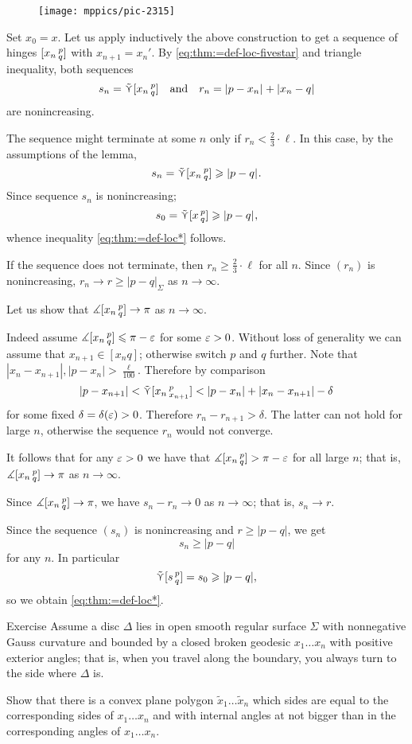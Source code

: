 \begin{figure}[h!]
\centering
\texttt{[image: mppics/pic-2315]}
\end{figure}

Set $x_0=x$.
Let us apply inductively the above construction to get a sequence of hinges  $[x_n\,{}^{p}_{q}]$ with $x_{n+1}=x_n'$.
By \ref{eq:thm:=def-loc-fivestar} and triangle inequality, both sequences
\[s_n=\side \hinge{x_n}pq\quad\text{and}\quad r_n=\dist{p}{x_n}{}+\dist{x_n}{q}{}\]
are nonincreasing.

The sequence might terminate at some $n$ only if $r_n< \tfrac{2}{3}\cdot\ell $.
In this case, by the assumptions of the lemma, 
\[s_n=\side \hinge{x_n}p q\ge\dist{p}{q}{}.\]
Since sequence $s_n$ is nonincreasing;
\[s_0=\side \hinge{x}p q\ge\dist{p}{q}{},\]
whence inequality \ref{eq:thm:=def-loc*} follows.

If the sequence does not terminate, then $r_n\ge\tfrac{2}{3}\cdot\ell$ for all $n$.
Since $(r_n)$ is nonincreasing, $r_n\to r\ge |p-q|_\Sigma$ as $n\to\infty$.

Let us show that $\measuredangle[x_n\,{}^{p}_{q}]\to \pi$ as $n\to\infty$.

Indeed assume $\measuredangle[x_n\,{}^{p}_{q}]\leqslant \pi-\varepsilon$ for some $\varepsilon>0$.
Without loss of generality we can assume that $x_{n+1}\in [x_nq]$;
otherwise switch $p$ and $q$ further.
Note that $|x_n-x_{n+1}|,|p-x_n|>\tfrac\ell{100}$.
Therefore by comparison 
\[|p-x_{n+1}|<\side\hinge{x_n}p{x_{n+1}}<|p-x_n|+|x_n-x_{n+1}|-\delta\]
for some fixed $\delta=\delta(\varepsilon)>0$.
Therefore $r_n-r_{n+1}>\delta$.
The latter can not hold for large $n$, otherwise the sequence $r_n$ would not converge.

It follows that for any $\varepsilon>0$ we have that $\measuredangle[x_n\,{}^{p}_{q}]> \pi-\varepsilon$ for all large $n$;
that is, $\measuredangle[x_n\,{}^{p}_{q}]\to \pi$ as $n\to\infty$.

Since $\measuredangle[x_n\,{}^{p}_{q}]\to \pi$, we have 
$s_n-r_n\to 0$ as $n\to\infty$;
that is, $s_n\to r$.

Since the sequence $(s_n)$ is nonincreasing and $r\ge |p-q|$, we get
\[s_n\ge |p-q|\]
for any $n$.
In particular
\[\tilde\curlyvee[s\,{}^{p}_{q}]=s_0\geqslant |p-q|,\] so we obtain \ref{eq:thm:=def-loc*}.
\qeds


\begin{thm}{Exercise}\label{ex:convex-polyhon}
Assume a disc $\Delta$ lies in open smooth regular surface $\Sigma$ with nonnegative Gauss curvature and bounded by a closed broken geodesic $x_1\dots x_n$ with positive exterior angles; that is, when you travel along the boundary, you always turn to the side where $\Delta$ is.

Show that there is a convex plane polygon $\tilde x_1\dots \tilde x_n$ which sides are equal to the corresponding sides of $x_1\dots x_n$ and with internal angles at not bigger than in the corresponding angles  of $x_1\dots x_n$.
\end{thm}

